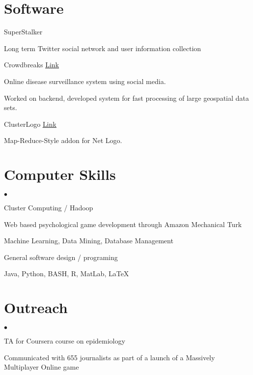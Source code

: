 \documentclass[margin,line]{res}
\newcommand{\linkToUrl}[1]{{\color{blue}\underline{\href{#1}{Link}}}}
\newenvironment{list1}{
  \begin{list}{\ding{113}}{%
      \setlength{\itemsep}{0in}
      \setlength{\parsep}{0in} \setlength{\parskip}{0in}
      \setlength{\topsep}{0in} \setlength{\partopsep}{0in} 
      \setlength{\leftmargin}{0.17in}}}{\end{list}}
\newenvironment{list2}{
  \begin{list}{$\bullet$}{%
      \setlength{\itemsep}{0in}
      \setlength{\parsep}{0in} \setlength{\parskip}{0in}
      \setlength{\topsep}{0in} \setlength{\partopsep}{0in} 
      \setlength{\leftmargin}{10pt}}}{\end{list}}
\begin{document}
\begin{resume}
\section{\sc Software}
SuperStalker
\begin{list1}
\item[] Long term Twitter social network and user information collection
\end{list1}

Crowdbreaks \linkToUrl{http://www.crowdbreaks.com}
\begin{list1}
\item[] Online disease surveillance system using social media.
\item[] Worked on backend, developed system for fast processing of large geospatial data sets.
\end{list1}

ClusterLogo \linkToUrl{http://bit.ly/12UQ4cq}
\begin{list1}
\item[] Map-Reduce-Style addon for Net Logo.
\end{list1}

\section{\sc Computer Skills} 
\begin{list2}
\item Cluster Computing / Hadoop 
\item Web based psychological game development through Amazon Mechanical Turk
\item Machine Learning, Data Mining, Database Management
\item General software design / programing
\item Java, Python, BASH, R, MatLab, \LaTeX
\end{list2}

\section{\sc Outreach}
\begin{list2}
\item TA for Coursera course on epidemiology
\item Communicated with 655 journalists as part of a launch of a Massively Multiplayer Online game
\end{list2}



\end{resume}
\end{document}

